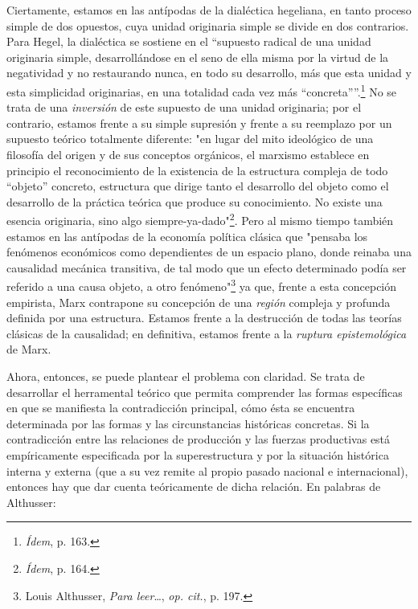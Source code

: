 Ciertamente, estamos en las antípodas de la dialéctica hegeliana, en
tanto proceso simple de dos opuestos, cuya unidad originaria simple se
divide en dos contrarios. Para Hegel, la dialéctica se sostiene en el
\enquote{supuesto radical de una unidad originaria simple, desarrollándose en el
seno de ella misma por la virtud de la negatividad y no restaurando
nunca, en todo su desarrollo, más que esta unidad y esta simplicidad
originarias, en una totalidad cada vez más ``concreta''}.\footnote{\emph{Ídem},
  p. 163.} No se trata de una \emph{inversión} de este supuesto de una
unidad originaria; por el contrario, estamos frente a su simple
supresión y frente a su reemplazo por un supuesto teórico totalmente
diferente: "en lugar del mito ideológico de una filosofía del origen y
de sus conceptos orgánicos, el marxismo establece en principio el
reconocimiento de la existencia de la estructura compleja de todo
``objeto'' concreto, estructura que dirige tanto el desarrollo del
objeto como el desarrollo de la práctica teórica que produce su
conocimiento. No existe una esencia originaria, sino algo
siempre-ya-dado"\footnote{\emph{Ídem}, p. 164.}. Pero al mismo tiempo
también estamos en las antípodas de la economía política clásica que
"pensaba los fenómenos económicos como dependientes de un espacio plano,
donde reinaba una causalidad mecánica transitiva, de tal modo que un
efecto determinado podía ser referido a una causa objeto, a otro
fenómeno"\footnote{Louis Althusser, \emph{Para leer}\ldots, \emph{op.
  cit.}, p. 197.} ya que, frente a esta concepción empirista, Marx
contrapone su concepción de una \emph{región} compleja y profunda
definida por una estructura. Estamos frente a la destrucción de todas
las teorías clásicas de la causalidad; en definitiva, estamos frente a
la \emph{ruptura epistemológica} de Marx.

Ahora, entonces, se puede plantear el problema con claridad. Se trata de
desarrollar el herramental teórico que permita comprender las formas
específicas en que se manifiesta la contradicción principal, cómo ésta
se encuentra determinada por las formas y las circunstancias históricas
concretas. Si la contradicción entre las relaciones de producción y las
fuerzas productivas está empíricamente especificada por la
superestructura y por la situación histórica interna y externa (que a su
vez remite al propio pasado nacional e internacional), entonces hay que
dar cuenta teóricamente de dicha relación. En palabras de Althusser:

